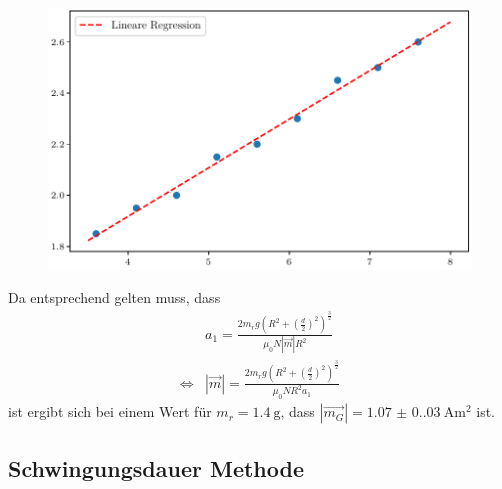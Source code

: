 \begin{figure}[H]
    \centering
    \includegraphics{plot1.pdf}
    \label{fig:grav}
\end{figure}
Da entsprechend gelten muss, dass
\begin{align}
    & a_1=\frac{2m_rg\left(R^2+\left(\frac{d}{2}\right)^2\right)^\frac{3}{2}}{\mu_0N|\vec{m}|R^2} \\
    \iff & |\vec{m}|=\frac{2m_rg\left(R^2+\left(\frac{d}{2}\right)^2\right)^\frac{3}{2}}{\mu_0NR^2a_1}
\end{align}
ist ergibt sich bei einem Wert für $m_r=\qty{1.4}{\gram}$, dass $|\vec{m_G}|=\qty{1.07(0.03)}{\ampere\meter\squared}$ ist.

\subsection{Schwingungsdauer Methode}

